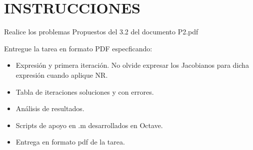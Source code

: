  \section{INSTRUCCIONES}
Realice los problemas Propuestos del 3.2  del documento P2.pdf

Entregue la tarea en formato PDF especficando:

\begin{itemize}
    \item  Expresión y primera iteración. No olvide expresar los Jacobianos para dicha expresión cuando aplique NR.
    \item Tabla de iteraciones soluciones y con errores.
    \item Análisis de resultados.
    \item Scripts de apoyo en .m desarrollados en Octave.
    \item Entrega en formato pdf de la tarea.
\end{itemize}
